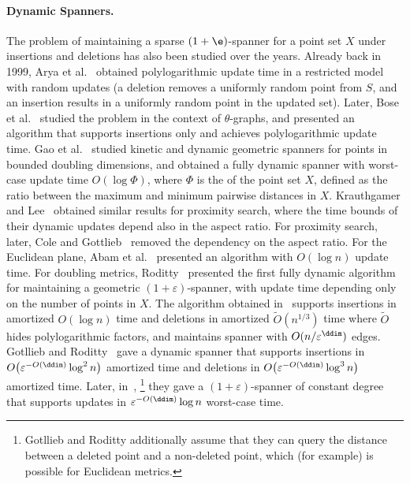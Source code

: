 \paragraph{Dynamic Spanners.} The problem of maintaining a sparse $(1+\e)$-spanner for a point set $X$ under insertions and deletions has also been studied over the years. Already back in 1999, Arya et al.~\cite{arya1999dynamic} obtained polylogarithmic update time in a restricted model with random updates
(a deletion removes a uniformly random point from $S$, and an insertion results in a uniformly random point in the updated set).
Later, Bose et al.~\cite{bose2004ordered} studied the problem in the context of $\theta$-graphs, and presented an algorithm that supports insertions only and achieves polylogarithmic update time. 
Gao et al.~\cite{gao2004deformable} studied kinetic and dynamic geometric spanners for points in bounded doubling dimensions, and obtained a fully dynamic spanner 
with worst-case update time $O(\log \Phi)$, where $\Phi$ is the 
 of the point set $X$, defined as the ratio between the maximum and minimum pairwise distances in $X$. Krauthgamer and Lee~\cite{KL04} obtained similar results for proximity search, where the time bounds of their dynamic updates depend also in the aspect ratio. For proximity search, later, Cole and Gottlieb~\cite{cole2006searching} removed the dependency on the aspect ratio. For the Euclidean plane, Abam et al.~\cite{abam2008simple} presented an algorithm with $O(\log n)$ update time. 
For doubling metrics, Roditty~\cite{roditty2012fully} presented the first fully dynamic algorithm for maintaining a geometric $(1+\varepsilon)$-spanner, with update time depending only on the number of points in $X$. The algorithm obtained in~\cite{roditty2012fully} supports insertions in amortized $O(\log n)$ time and deletions in amortized $\tilde{O}(n^{1/3})$ time
where $\tilde{O}$ hides polylogarithmic factors, 
and maintains spanner with $O(n / \varepsilon^{\ddim})$ edges.
Gotllieb and Roditty~\cite{GottliebR08}
gave a dynamic spanner that supports insertions in \(O\!\left(\varepsilon^{-O(\ddim)} \log^{2} n\right)\) amortized time and deletions in \(O\!\left(\varepsilon^{-O(\ddim)} \log^{3} n\right)\) amortized time.
Later, in~\cite{gottlieb2008optimal},
\footnote{Gotllieb and Roditty \cite{gottlieb2008optimal} additionally assume that they can query the distance between a deleted point and a non-deleted point, which (for example) is possible for Euclidean metrics.}
they gave a \((1+\varepsilon)\)-spanner of constant degree that supports updates in $\varepsilon^{-O(\ddim)} \log n$ worst-case time.
